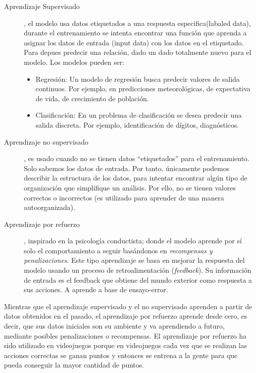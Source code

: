 \begin{description}
 \item [Aprendizaje Supervisado], el modelo usa datos etiquetados a una respuesta especifica(labaled data), durante el entrenamiento se intenta encontrar una función que aprenda a asignar los datos de entrada (input data) con los datos en el etiquetado. Para depues predecir una relación, dado un dado totalmente nuevo para el modelo. Los modelos pueden ser:
    \begin{itemize}
    \item Regresión: Un modelo de regresión busca predecir valores de salida continuos. Por ejemplo, en predicciones meteorológicas, de expectativa de vida, de crecimiento de población.
    \item Clasificación: En un problema de clasificación se desea predecir una salida discreta. Por ejemplo, identificación de dígitos, diagnósticos.
    \end{itemize}

 \item [Aprendizaje no supervisado], es usado cuando no se tienen datos “etiquetados” para el entrenamiento. Solo sabemos los datos de entrada. Por tanto, únicamente podemos describir la estructura de los datos, para intentar encontrar algún tipo de organización que simplifique un análisis. Por ello, no se tienen valores correctos o incorrectos (es utilizado para aprender de una manera autoorganizada).
 
 \item [Aprendizaje por refuerzo], inspirado en la psicología conductista; donde el modelo aprende por sí solo el comportamiento a seguir basándonos en \emph{recompensas y penalizaciones}. Este tipo aprendizaje se basa en mejorar la respuesta del modelo usando un proceso de retroalimentación (\emph{feedback}). Su información de entrada es el feedback que obtiene del mundo exterior como respuesta a sus acciones. A aprende a base de ensayo-error.
 
\end{description}


Mientras que el aprendizaje supervisado y el no supervisado aprenden a partir de datos obtenidos en el pasado, el aprendizaje por refuerzo aprende desde cero, es decir, que sus datos iniciales son su ambiente y va aprendiendo a futuro, mediante posibles penalizaciones o recompensas.  El aprendizaje por refuerzo ha sido utilizado en videojuegos porque en videojuegos cada vez que se realizan las acciones correctas se ganan puntos y entonces se entrena a la gente para que pueda conseguir la mayor cantidad de puntos.
 

